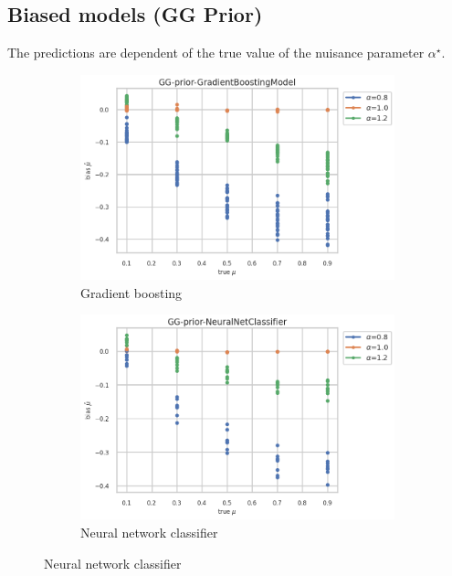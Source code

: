\clearpage

\subsection{Biased models (GG Prior)}

The predictions are dependent of the true value of the nuisance parameter $\alpha^\star$.


\begin{figure}[ht!]
  \centering
  \begin{subfigure}[t]{0.49\linewidth}
    \includegraphics[width=\linewidth]{COMPARE/GG-prior/GradientBoostingModel/profusion_true_mu_target_bias.png}
    \caption{Gradient boosting}
  \end{subfigure}%
  \hfill
  \begin{subfigure}[t]{0.49\linewidth}
    \includegraphics[width=\linewidth]{COMPARE/GG-prior/NeuralNetClassifier/profusion_true_mu_target_bias.png}
    \caption{Neural network classifier}
  \end{subfigure}


\end{figure}
